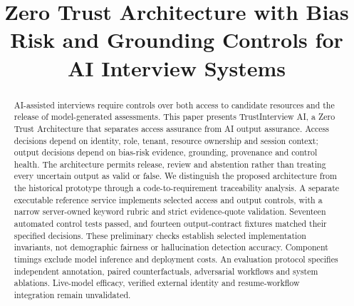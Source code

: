 \documentclass[conference]{IEEEtran}
\begin{document}
\title{Zero Trust Architecture with Bias Risk and Grounding Controls for AI Interview Systems}

\author{%
\and
{}
\and
{}
\and
{}
}


\maketitle

\begin{abstract}
AI-assisted interviews require controls over both access to candidate resources and the release of model-generated assessments. This paper presents TrustInterview AI, a Zero Trust Architecture that separates access assurance from AI output assurance. Access decisions depend on identity, role, tenant, resource ownership and session context; output decisions depend on bias-risk evidence, grounding, provenance and control health. The architecture permits release, review and abstention rather than treating every uncertain output as valid or false. We distinguish the proposed architecture from the historical prototype through a code-to-requirement traceability analysis. A separate executable reference service implements selected access and output controls, with a narrow server-owned keyword rubric and strict evidence-quote validation. Seventeen automated control tests passed, and fourteen output-contract fixtures matched their specified decisions. These preliminary checks establish selected implementation invariants, not demographic fairness or hallucination detection accuracy. Component timings exclude model inference and deployment costs. An evaluation protocol specifies independent annotation, paired counterfactuals, adversarial workflows and system ablations. Live-model efficacy, verified external identity and resume-workflow integration remain unvalidated.

\end{abstract}
\end{document}
